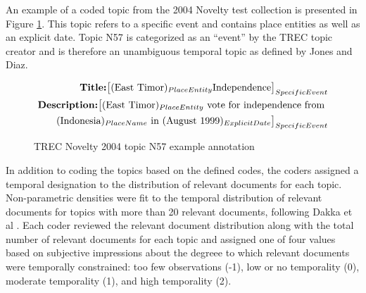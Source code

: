 \documentclass{sig-alternate-05-2015}
\begin{document}

An example of a coded topic from the 2004 Novelty test collection is presented in Figure \ref{fig.example}.  This topic refers to a specific event and contains place entities as well as an explicit date.  Topic N57 is categorized as an ``event'' by the TREC topic creator and is therefore an unambiguous temporal topic as defined by Jones and Diaz.
\begin{figure}[!ht]
\scriptsize
\begin{equation*}
\begin{split}
\mbox{\bf{Title}:}  \big[(\mbox{East Timor})_{PlaceEntity} \mbox{Independence}\big]_{SpecificEvent} \\
\mbox{\bf{Description}:}  \big[  (\mbox{East Timor})_{PlaceEntity} \mbox{ vote for independence from } \\
	 (\mbox{Indonesia})_{PlaceName}  \mbox{ in } (\mbox{August 1999})_{ExplicitDate}\big]_{SpecificEvent}
\end{split}
\end{equation*}
\vspace{-.75em}
\caption{TREC Novelty 2004 topic N57 example annotation}
\label{fig.example}
\end{figure}

In addition to coding the topics based on the defined codes, the coders assigned a temporal designation to the distribution of relevant documents for each topic. Non-parametric densities were fit to the temporal distribution of relevant documents for topics with more than 20 relevant documents, following Dakka et al \cite{Dakka2012}. Each coder reviewed the relevant document distribution along with the total number of relevant documents for each topic and assigned one of four values based on subjective impressions about the degreee to which relevant documents were temporally constrained:  too few observations (-1), low or no temporality (0), moderate temporality (1), and high temporality (2). 
\end{document}
